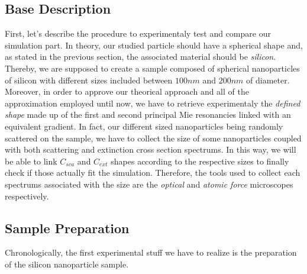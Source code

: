\documentclass{article}
\numberwithin{equation}{section}
\begin{document}
\subsection{Base Description}

First, let's describe the procedure to experimentaly test and compare our simulation part. In theory, our studied particle should have a spherical shape and, as stated in the previous section, the associated material should be \textit{silicon}. Thereby, we are supposed to create a sample composed of spherical nanoparticles of silicon with different sizes included between $100nm$ and $200nm$ of diameter. Moreover, in order to approve our theorical approach and all of the approximation employed until now, we have to retrieve experimentaly the \textit{defined shape} made up of the first and second principal Mie resonancies linked with an equivalent gradient. In fact, our different sized nanoparticles being randomly scattered on the sample, we have to collect the size of some nanoparticles coupled with both scattering and extinction cross section spectrums. In this way, we will be able to link $C_{sca}$ and $C_{ext}$ shapes according to the respective sizes to finally check if those actually fit the simulation. Therefore, the tools used to collect each spectrums associated with the size are the \textit{optical} and \textit{atomic force} microscopes respectively.

\subsection{Sample Preparation}

Chronologically, the first experimental stuff we have to realize is the preparation of the silicon nanoparticle sample.
\end{document}
